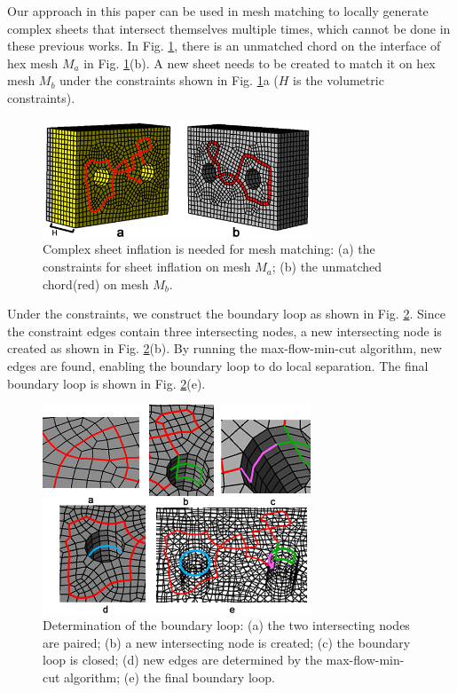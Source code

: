 \documentclass[final,5p,times,twocolumn]{elsarticle}
\begin{document}
Our approach in this paper can be used in mesh matching to locally generate complex sheets that intersect themselves multiple times, which cannot be done in these previous works. In Fig. \ref{fig:exam1_input}, there is an unmatched chord on the interface of hex mesh $M_a$ in Fig. \ref{fig:exam1_input}(b). A new sheet needs to be created to match it on hex mesh $M_b$ under the constraints shown in Fig. \ref{fig:exam1_input}a ($H$ is the volumetric constraints).

\begin{figure}[htbp]
\begin{center}
\includegraphics[width=8cm]{exam1_input.png}
\caption{Complex sheet inflation is needed for mesh matching: (a) the constraints for sheet inflation on mesh $M_a$; (b) the unmatched chord(red) on mesh $M_b$.}
\label{fig:exam1_input}
\end{center}
\end{figure}

Under the constraints, we construct the boundary loop as shown in Fig. \ref{fig:exam1_bound_loop}. Since the constraint edges contain three intersecting nodes, a new intersecting node is created as shown in Fig. \ref{fig:exam1_bound_loop}(b). By running the max-flow-min-cut algorithm, new edges are found, enabling the boundary loop to do local separation. The final boundary loop is shown in Fig. \ref{fig:exam1_bound_loop}(e).

\begin{figure}[htbp]
\begin{center}
\includegraphics[width=8cm]{exam1_bound_loop.png}
\caption{Determination of the boundary loop: (a) the two intersecting nodes are paired; (b) a new intersecting node is created; (c) the boundary loop is closed; (d) new edges are determined by the max-flow-min-cut algorithm; (e) the final boundary loop.}
\label{fig:exam1_bound_loop}
\end{center}
\end{figure}
\end{document}
